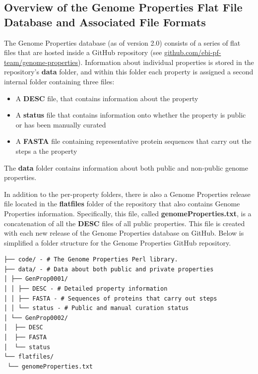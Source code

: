 \subsection{Overview of the Genome Properties Flat File Database and Associated File Formats} \label{Genome-Properties-Files} 

The Genome Properties database (as of version 2.0) consists of a series of flat files that are hosted inside a GitHub repository (see \href{github.com/ebi-pf-team/genome-properties}{github.com/ebi-pf-team/genome-properties}). Information about individual properties is stored in the repository's \textbf{data} folder, and within this folder each property is assigned a second internal folder containing three files: 

\begin{itemize}
\item A \textbf{DESC} file, that contains information about the property
\item A \textbf{status} file that contains information onto whether the property is public or has been manually curated
\item A \textbf{FASTA} \cite{pearson19905} file containing representative protein sequences that carry out the steps a the property
\end{itemize}

The \textbf{data} folder contains information about both public and non-public genome properties. 

In addition to the per-property folders, there is also a Genome Properties release file located in the \textbf{flatfiles} folder of the repository that also contains Genome Properties information. Specifically, this file, called \textbf{genomeProperties.txt}, is a concatenation of all the \textbf{DESC} files of all public properties. This file is created with each new release of the Genome Properties database on GitHub. Below is simplified a folder structure for the Genome Properties GitHub repository.

\begin{verbatim}
├── code/ - # The Genome Properties Perl library.
├── data/ - # Data about both public and private properties
│ ├── GenProp0001/
│ │ ├── DESC - # Detailed property information
│ │ ├── FASTA - # Sequences of proteins that carry out steps
│ │ └── status - # Public and manual curation status
│ └── GenProp0002/
│  ├── DESC
│  ├── FASTA
│  └── status
└── flatfiles/
 └── genomeProperties.txt
\end{verbatim}

